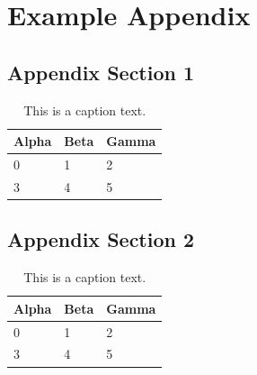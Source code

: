 %
\chapter{Example Appendix}
\label{sec:appendix}

\Blindtext[1][1]

\section{Appendix Section 1}
\label{sec:appendix:sec1}

\Blindtext[1][1]

\begin{table}[h]
	\begin{tabularx}{\textwidth}{X | X | X}
		Alpha		& Beta			& Gamma			\\ \hline
		0			& 1				& 2				\\ \hline
		3			& 4				& 5				\\ %
	\end{tabularx}
	\label{tab:table1}
	\caption{This is a caption text.}
\end{table}

\section{Appendix Section 2}
\label{sec:appendix:sec2}

\Blindtext[1][1]

\begin{table}[h]
	\begin{tabularx}{\textwidth}{X | X | X}
		Alpha		& Beta			& Gamma			\\ \hline
		0			& 1				& 2				\\ \hline
		3			& 4				& 5				\\ %
	\end{tabularx}
	\label{tab:table2}
	\caption{This is a caption text.}
\end{table}

\Blindtext[1][2]